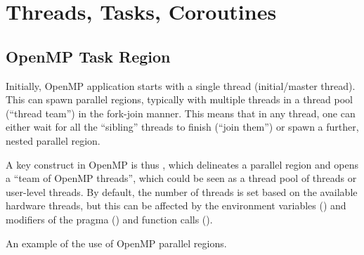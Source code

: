 \section{Threads, Tasks, Coroutines}  

\subsection{OpenMP Task Region}

Initially, OpenMP application starts with a single thread (initial/master thread). This can spawn parallel regions, typically with multiple threads in a thread pool (``thread team'') in the fork-join manner. 
This means that in any thread, one can either wait for all the ``sibling'' threads to finish (``join them'') or spawn a further, nested parallel region.

A key construct in OpenMP is thus , which delineates a parallel region and opens a ``team of OpenMP threads'', which could be seen as a thread pool of threads or user-level threads. 
By default, the number of threads is set based on the available hardware threads, but this can be affected by the environment variables () and modifiers of the pragma () and function calls (). 

\raggedbottom
\begin{codebox}[]{\href{https://godbolt.org/z/bdP9o8rov}{\ExternalLink}}
\footnotesize An example of the use of OpenMP parallel regions.
\tcblower
{}
\end{codebox}

